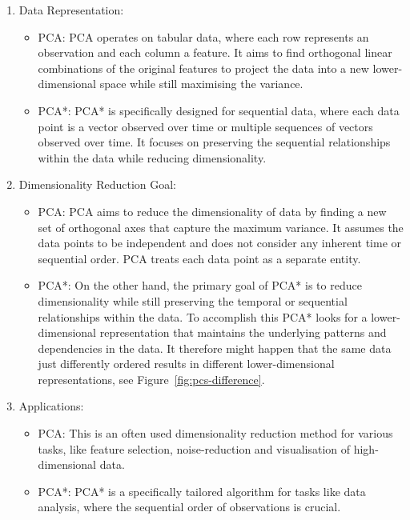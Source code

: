 \documentclass[pdftex,12pt,a4paper]{report}
\begin{document}
\begin{enumerate}
    \item Data Representation:
    \begin{itemize}
        \item PCA: PCA operates on tabular data, where each row represents an observation and each column a feature.
        It aims to find orthogonal linear combinations of the original features to project the data into a new lower-dimensional space while still maximising the variance.
        \item PCA*: PCA* is specifically designed for sequential data, where each data point is a vector observed over time or multiple sequences of vectors observed over time.
        It focuses on preserving the sequential relationships within the data while reducing dimensionality.
    \end{itemize}
    \item Dimensionality Reduction Goal:
    \begin{itemize}
        \item PCA: PCA aims to reduce the dimensionality of data by finding a new set of orthogonal axes that capture the maximum variance.
        It assumes the data points to be independent and does not consider any inherent time or sequential order.
        PCA treats each data point as a separate entity.
        \item PCA*: On the other hand, the primary goal of PCA* is to reduce dimensionality while still preserving the temporal or sequential relationships within the data.
        To accomplish this PCA* looks for a lower-dimensional representation that maintains the underlying patterns and dependencies in the data.
        It therefore might happen that the same data just differently ordered results in different lower-dimensional representations, see Figure~\ref{fig:pcs-difference}.
    \end{itemize}
    \item Applications:
    \begin{itemize}
        \item PCA: This is an often used dimensionality reduction method for various tasks, like feature selection, noise-reduction and visualisation of high-dimensional data.
        \item PCA*: PCA* is a specifically tailored algorithm for tasks like data analysis, where the sequential order of observations is crucial.
    \end{itemize}
\end{enumerate}
\end{document}

